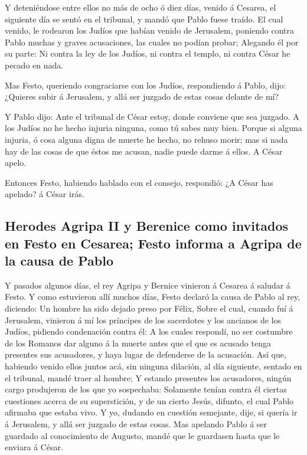  Y deteniéndose entre ellos no más de ocho ó diez días,
venido á Cesarea, el siguiente día se sentó en el tribunal, y mandó que
Pablo fuese traído.  El cual venido, le rodearon los
Judíos que habían venido de Jerusalem, poniendo contra Pablo muchas y
graves acusaciones, las cuales no podían probar;  Alegando
él por su parte: Ni contra la ley de los Judíos, ni contra el templo, ni
contra César he pecado en nada.

 Mas Festo, queriendo congraciarse con los Judíos,
respondiendo á Pablo, dijo: ¿Quieres subir á Jerusalem, y allá ser
juzgado de estas cosas delante de mí?

 Y Pablo dijo: Ante el tribunal de César estoy, donde
conviene que sea juzgado. A los Judíos no he hecho injuria ninguna, como
tú sabes muy bien.  Porque si alguna injuria, ó cosa
alguna digna de muerte he hecho, no rehuso morir; mas si nada hay de las
cosas de que éstos me acusan, nadie puede darme á ellos. A César apelo.

 Entonces Festo, habiendo hablado con el consejo,
respondió: ¿A César has apelado? á César irás.

\hypertarget{herodes-agripa-ii-y-berenice-como-invitados-en-festo-en-cesarea-festo-informa-a-agripa-de-la-causa-de-pablo}{%
\subsection{Herodes Agripa II y Berenice como invitados en Festo en
Cesarea; Festo informa a Agripa de la causa de
Pablo}\label{herodes-agripa-ii-y-berenice-como-invitados-en-festo-en-cesarea-festo-informa-a-agripa-de-la-causa-de-pablo}}

 Y pasados algunos días, el rey Agripa y Bernice vinieron
á Cesarea á saludar á Festo.  Y como estuvieron allí
muchos días, Festo declaró la causa de Pablo al rey, diciendo: Un hombre
ha sido dejado preso por Félix,  Sobre el cual, cuando
fuí á Jerusalem, vinieron á mí los príncipes de los sacerdotes y los
ancianos de los Judíos, pidiendo condenación contra él: 
A los cuales respondí, no ser costumbre de los Romanos dar alguno á la
muerte antes que el que es acusado tenga presentes sus acusadores, y
haya lugar de defenderse de la acusación.  Así que,
habiendo venido ellos juntos acá, sin ninguna dilación, al día
siguiente, sentado en el tribunal, mandé traer al hombre;
 Y estando presentes los acusadores, ningún cargo
produjeron de los que yo sospechaba:  Solamente tenían
contra él ciertas cuestiones acerca de su superstición, y de un cierto
Jesús, difunto, el cual Pablo afirmaba que estaba vivo. 
Y yo, dudando en cuestión semejante, dije, si quería ir á Jerusalem, y
allá ser juzgado de estas cosas.  Mas apelando Pablo á
ser guardado al conocimiento de Augusto, mandé que le guardasen hasta
que le enviara á César.

